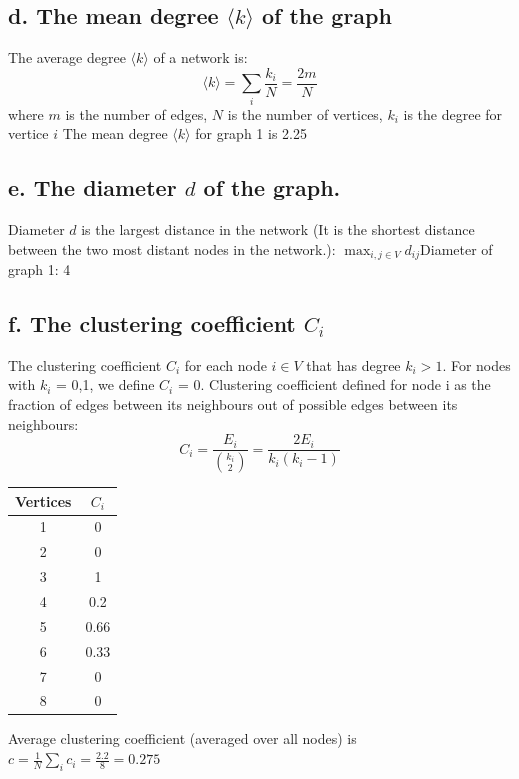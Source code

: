 \documentclass[a4paper,12pt]{article}
\begin{document}
\subsection*{d. The mean degree $\langle k \rangle$ of the graph}
The average degree $\langle k \rangle$ of a network is:
$$\langle k \rangle = \sum_{i}\frac{k_i}{N} = \frac{2m}{N}$$
where $m$ is the number of edges, $N$ is the number of vertices, $k_i$ is the degree for vertice $i$\newline\newline
The mean degree $\langle k \rangle$ for graph 1 is 2.25

\subsection*{e. The diameter $d$ of the graph.}
Diameter $d$ is the largest distance in the network (It is the shortest distance between the two most distant nodes in the network.): $\max_{i,j \in V}d_{ij}$\newline\newline Diameter of graph 1: 4

\subsection*{f. The clustering coefficient $C_i$}
The clustering coefficient $C_i$ for each node $i \in V$ that has degree $k_i > 1$. For nodes with $k_i$ = 0,1, we define $C_i$ = 0.\newline\newline
Clustering coefficient defined for node i as the fraction of edges between
its neighbours out of possible edges between its neighbours:
$$C_i = \frac{E_i}{{k_i\choose2}} = \frac{2E_i}{k_i(k_i - 1)}$$
\begin{table}[h]
\centering
\begin{tabular}{c|c}
Vertices & $C_i$\\
\hline
1 & 0\\
2 & 0\\
3 & 1\\
4 & 0.2\\
5 & 0.66\\
6 & 0.33\\
7 & 0\\
8 & 0 
\end{tabular}
\end{table}
\newline
Average clustering coefficient (averaged over all nodes) is $c = \frac{1}{N}\sum_{i}c_i = \frac{2.2}{8} = 0.275$
\end{document}
